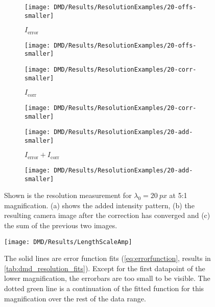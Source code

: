 \begin{figure}[htbp]
    \centering
    \begin{subfigure}[T]{0.24\textwidth}
        \centering
        \texttt{[image: DMD/Results/ResolutionExamples/20-offs-smaller]}
        \caption{$I_\text{error}$}
        \label{fig:dmd_wave_error_example}
    \end{subfigure}
    \hspace{-1.7em}
    \begin{subfigure}[T]{0.075\textwidth}
        \centering
        \texttt{[image: DMD/Results/ResolutionExamples/20-offs-smaller]}
    \end{subfigure}
    \hfill
    \begin{subfigure}[T]{0.24\textwidth}
        \centering
        \texttt{[image: DMD/Results/ResolutionExamples/20-corr-smaller]}
        \caption{$I_\text{corr}$}
        \label{fig:dmd_wave_corr_example}
    \end{subfigure}
    \hspace{-1.7em}
    \begin{subfigure}[T]{0.075\textwidth}
        \centering
        \texttt{[image: DMD/Results/ResolutionExamples/20-corr-smaller]}
    \end{subfigure}
    \hfill
    \begin{subfigure}[T]{0.24\textwidth}
        \centering
        \texttt{[image: DMD/Results/ResolutionExamples/20-add-smaller]}
        \caption{$I_\text{error} + I_\text{corr}$}
        \label{fig:dmd_wave_sum_example}
    \end{subfigure}
    \hspace{-1.7em}
    \begin{subfigure}[T]{0.075\textwidth}
        \centering
        \texttt{[image: DMD/Results/ResolutionExamples/20-add-smaller]}
    \end{subfigure}  
    \caption[Test example with added wave pattern]{Shown is the resolution measurement for $\lambda_0=\SI{20}{px}$ at 5:1 magnification. (a) shows the added intensity pattern, (b) the resulting camera image after the correction has converged and (c) the sum of the previous two images.}
    \label{fig:dmd_results_resolution_example}   
\end{figure}
\begin{figure}[htbp]
    \centering
    \texttt{[image: DMD/Results/LengthScaleAmp]}
    \caption[Detected amplitude of the wave pattern depending on the period]{The solid lines are error function fits (\cref{eq:errorfunction}, results in \cref{tab:dmd_resolution_fits}). Except for the first datapoint of the lower magnification, the errorbars are too small to be visible. The dotted green line is a continuation of the fitted function for this magnification over the rest of the data range.}
    \label{fig:dmd_results_resolution_amplitude}
\end{figure}

